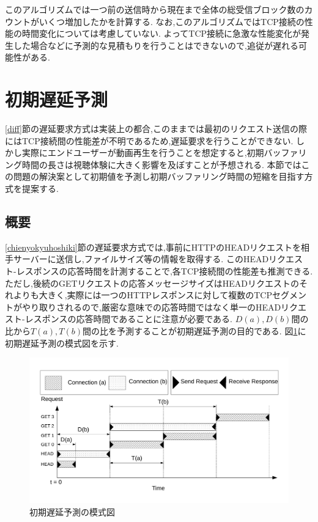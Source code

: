 \documentclass[a4j,12pt]{gradthesis_utf8}
\begin{document}
このアルゴリズムでは一つ前の送信時から現在まで全体の総受信ブロック数のカウントがいくつ増加したかを計算する.
なお,このアルゴリズムではTCP接続の性能の時間変化については考慮していない.
よってTCP接続に急激な性能変化が発生した場合などに予測的な見積もりを行うことはできないので,追従が遅れる可能性がある.

\newpage

\section{初期遅延予測}
\label{shoki}
\ref{diff}節の遅延要求方式は実装上の都合,このままでは最初のリクエスト送信の際にはTCP接続間の性能差が不明であるため,遅延要求を行うことができない.
しかし実際にエンドユーザーが動画再生を行うことを想定すると,初期バッファリング時間の長さは視聴体験に大きく影響を及ぼすことが予想される.
本節ではこの問題の解決案として初期値を予測し初期バッファリング時間の短縮を目指す方式を提案する.

\subsection{概要}
\label{shokigaiyo}
\ref{chienyokyuhoshiki}節の遅延要求方式では,事前にHTTPのHEADリクエストを相手サーバーに送信し,ファイルサイズ等の情報を取得する.
このHEADリクエスト-レスポンスの応答時間を計測することで,各TCP接続間の性能差も推測できる.
ただし,後続のGETリクエストの応答メッセージサイズはHEADリクエストのそれよりも大きく,実際には一つのHTTPレスポンスに対して複数のTCPセグメントがやり取りされるので,厳密な意味での応答時間ではなく単一のHEADリクエスト-レスポンスの応答時間であることに注意が必要である.
\begin{math}D(a), D(b)\end{math}間の比から\begin{math}T(a), T(b)\end{math}間の比を予測することが初期遅延予測の目的である.
図\ref{head}に初期遅延予測の模式図を示す.

\begin{figure}[ht]
	\centering
	\includegraphics[width=15cm]{figure/head.pdf}
	\caption{初期遅延予測の模式図}
	\label{head}
\end{figure}
\end{document}
